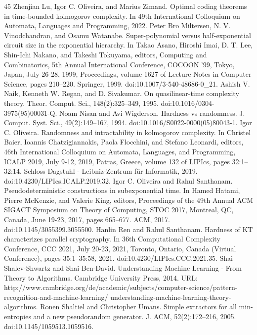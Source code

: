 \begin{thebibliography}{45}
 Zhenjian Lu, Igor C. Oliveira, and Marius Zimand. Optimal coding theorems in time-bounded kolmogorov complexity. In 49th International Colloquium on Automata, Languages and Programming, 2022.
 Peter Bro Miltersen, N. V. Vinodchandran, and Osamu Watanabe. Super-polynomial versus half-exponential circuit size in the exponential hierarchy. In Takao Asano, Hiroshi Imai, D. T. Lee, Shin-Ichi Nakano, and Takeshi Tokuyama, editors, Computing and Combinatorics, 5th Annual International Conference, COCOON ’99, Tokyo, Japan, July 26-28, 1999, Proceedings, volume 1627 of Lecture Notes in Computer Science, pages 210–220. Springer, 1999. doi:10.1007/3-540-48686-0\_21.
 Ashish V. Naik, Kenneth W. Regan, and D. Sivakumar. On quasilinear-time complexity theory. Theor. Comput. Sci., 148(2):325–349, 1995. doi:10.1016/0304-3975(95)00031-Q.
 Noam Nisan and Avi Wigderson. Hardness vs randomness. J. Comput. Syst. Sci., 49(2):149–167, 1994. doi:10.1016/S0022-0000(05)80043-1.
 Igor C. Oliveira. Randomness and intractability in kolmogorov complexity. In Christel Baier, Ioannis Chatzigiannakis, Paola Flocchini, and Stefano Leonardi, editors, 46th International Colloquium on Automata, Languages, and Programming, ICALP 2019, July 9-12, 2019, Patras, Greece, volume 132 of LIPIcs, pages 32:1–32:14. Schloss Dagstuhl - Leibniz-Zentrum für Informatik, 2019. doi:10.4230/LIPIcs.ICALP.2019.32.
 Igor C. Oliveira and Rahul Santhanam. Pseudodeterministic constructions in subexponential time. In Hamed Hatami, Pierre McKenzie, and Valerie King, editors, Proceedings of the 49th Annual ACM SIGACT Symposium on Theory of Computing, STOC 2017, Montreal, QC, Canada, June 19-23, 2017, pages 665–677. ACM, 2017. doi:10.1145/3055399.3055500.
 Hanlin Ren and Rahul Santhanam. Hardness of KT characterizes parallel cryptography. In 36th Computational Complexity Conference, CCC 2021, July 20-23, 2021, Toronto, Ontario, Canada (Virtual Conference), pages 35:1–35:58, 2021. doi:10.4230/LIPIcs.CCC.2021.35.
 Shai Shalev-Shwartz and Shai Ben-David. Understanding Machine Learning - From Theory to Algorithms. Cambridge University Press, 2014. URL: http://www.cambridge.org/de/academic/subjects/computer-science/pattern-recognition-and-machine-learning/ understanding-machine-learning-theory-algorithms.
 Ronen Shaltiel and Christopher Umans. Simple extractors for all min-entropies and a new pseudorandom generator. J. ACM, 52(2):172–216, 2005. doi:10.1145/1059513.1059516.

\end{thebibliography}
